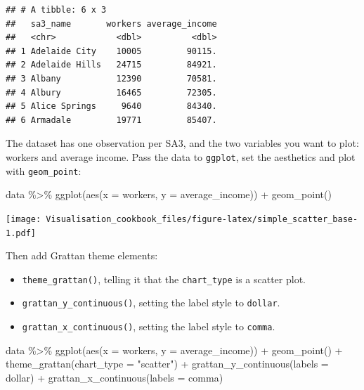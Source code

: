 \documentclass[
]{book}
\newenvironment{Shaded}{\begin{snugshade}}{\end{snugshade}}
\newcommand{\AttributeTok}[1]{\textcolor[rgb]{0.77,0.63,0.00}{#1}}
\newcommand{\FunctionTok}[1]{\textcolor[rgb]{0.00,0.00,0.00}{#1}}
\newcommand{\NormalTok}[1]{#1}
\newcommand{\SpecialCharTok}[1]{\textcolor[rgb]{0.00,0.00,0.00}{#1}}
\newcommand{\StringTok}[1]{\textcolor[rgb]{0.31,0.60,0.02}{#1}}
\providecommand{\tightlist}{%
  \setlength{\itemsep}{0pt}\setlength{\parskip}{0pt}}
\begin{document}
\begin{verbatim}
## # A tibble: 6 x 3
##   sa3_name       workers average_income
##   <chr>            <dbl>          <dbl>
## 1 Adelaide City    10005         90115.
## 2 Adelaide Hills   24715         84921.
## 3 Albany           12390         70581.
## 4 Albury           16465         72305.
## 5 Alice Springs     9640         84340.
## 6 Armadale         19771         85407.
\end{verbatim}

The dataset has one observation per SA3, and the two variables you want to plot: workers and average income. Pass the data to \texttt{ggplot}, set the aesthetics and plot with \texttt{geom\_point}:

\begin{Shaded}
\begin{Highlighting}[]
\NormalTok{data }\SpecialCharTok{\%\textgreater{}\%} 
  \FunctionTok{ggplot}\NormalTok{(}\FunctionTok{aes}\NormalTok{(}\AttributeTok{x =}\NormalTok{ workers,}
             \AttributeTok{y =}\NormalTok{ average\_income)) }\SpecialCharTok{+} 
  \FunctionTok{geom\_point}\NormalTok{()}
\end{Highlighting}
\end{Shaded}

\texttt{[image: Visualisation\_cookbook\_files/figure-latex/simple\_scatter\_base-1.pdf]}

Then add Grattan theme elements:

\begin{itemize}
\tightlist
\item
  \texttt{theme\_grattan()}, telling it that the \texttt{chart\_type} is a scatter plot.
\item
  \texttt{grattan\_y\_continuous()}, setting the label style to \texttt{dollar}.
\item
  \texttt{grattan\_x\_continuous()}, setting the label style to \texttt{comma}.
\end{itemize}

\begin{Shaded}
\begin{Highlighting}[]
\NormalTok{data }\SpecialCharTok{\%\textgreater{}\%} 
  \FunctionTok{ggplot}\NormalTok{(}\FunctionTok{aes}\NormalTok{(}\AttributeTok{x =}\NormalTok{ workers,}
             \AttributeTok{y =}\NormalTok{ average\_income)) }\SpecialCharTok{+} 
  \FunctionTok{geom\_point}\NormalTok{()  }\SpecialCharTok{+}
  \FunctionTok{theme\_grattan}\NormalTok{(}\AttributeTok{chart\_type =} \StringTok{"scatter"}\NormalTok{) }\SpecialCharTok{+} 
  \FunctionTok{grattan\_y\_continuous}\NormalTok{(}\AttributeTok{labels =}\NormalTok{ dollar) }\SpecialCharTok{+} 
  \FunctionTok{grattan\_x\_continuous}\NormalTok{(}\AttributeTok{labels =}\NormalTok{ comma)}
\end{Highlighting}
\end{Shaded}
\end{document}

